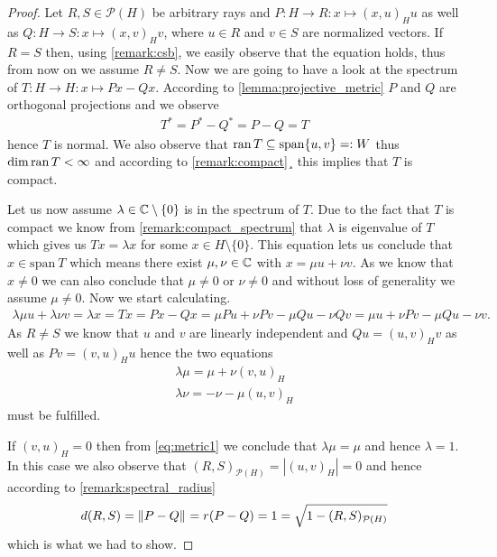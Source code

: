 \begin{proof}
	Let $R,S \in\mathcal{P}(H)$ be arbitrary rays and $P: H \to R: x \mapsto (x, u)_H u$ as well as $Q: H \to S: x \mapsto (x, v)_H v$, where $u \in R$ and $v \in S$ are normalized vectors. If $R = S$ then, using \ref{remark:csb}, we easily observe that the equation holds, thus from now on we assume $R \neq S$. Now we are going to have a look at the spectrum of $T: H \to H: x  \mapsto Px - Qx$. According to \ref{lemma:projective_metric} $P$ and $Q$ are orthogonal projections and we observe
	\begin{align*}
		T^\ast = P^\ast - Q^\ast = P - Q = T
	\end{align*}
	hence $T$ is normal. We also observe that $\operatorname{ran} T \subseteq \mathrm{span}\{u, v\} =: W$ thus $\dim \operatorname{ran} T < \infty$ and according to \ref{remark:compact}¸ this implies that $T$ is compact.
	
	Let us now assume $\lambda \in \mathbb{C} \setminus \{0\}$ is in the spectrum of $T$. Due to the fact that $T$ is compact we know from \ref{remark:compact_spectrum} that $\lambda$ is eigenvalue of $T$ which gives us $T x = \lambda x$ for some $x \in H \setminus \{0\}$. This equation lets us conclude that $x \in \mathrm{span 
	}\ T$ which means there exist $\mu, \nu \in \mathbb{C}$ with $x = \mu u + \nu v$. As we know that $x \neq 0$ we can also conclude that $\mu \neq 0$ or $\nu \neq 0$ and without loss of generality we assume $\mu \neq 0$. Now we start calculating.
	\begin{align*}
		\lambda \mu u + \lambda \nu v = \lambda x = Tx = Px - Qx = \mu Pu + \nu Pv - \mu Qu - \nu Qv = \mu u + \nu Pv - \mu Qu - \nu v .
	\end{align*}
	As $R \neq S$ we know that $u$ and $v$ are linearly independent and $Qu = (u,v)_H v$ as well as $Pv = (v,u)_H u$ hence the two equations
	\begin{align}
		\lambda \mu  = \mu  + \nu (v,u)_H \label{eq:metric1}\\
		 \lambda \nu  = - \nu  - \mu (u,v)_H \label{eq:metric2}
	\end{align}
	must be fulfilled. 
	
	If $(v,u)_H = 0$ then from \eqref{eq:metric1} we conclude that $\lambda \mu = \mu$ and hence $\lambda = 1$. In this case we also observe that $(R,S)_{\mathcal{P}(H)} = |(u,v)_H| = 0$ and hence according to \ref{remark:spectral_radius}
	\begin{align*}
		d(R,S) = {\left \| P - Q \right \|}_{} = r(P - Q) = 1 = \sqrt{1 - (R,S)_{\mathcal{P}(H)}}
	\end{align*}
	which is what we had to show.
	

\end{proof}
